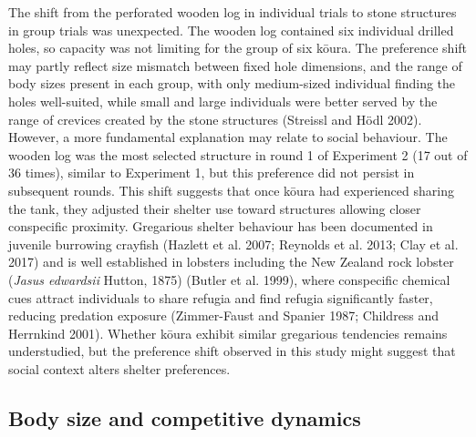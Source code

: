 \documentclass[
  12pt,
  a4paper,
  oneside]{scrbook}
\begin{document}
The shift from the perforated wooden log in individual trials to stone
structures in group trials was unexpected. The wooden log contained six
individual drilled holes, so capacity was not limiting for the group of
six kōura. The preference shift may partly reflect size mismatch between
fixed hole dimensions, and the range of body sizes present in each
group, with only medium-sized individual finding the holes well-suited,
while small and large individuals were better served by the range of
crevices created by the stone structures (Streissl and Hödl 2002).
However, a more fundamental explanation may relate to social behaviour.
The wooden log was the most selected structure in round 1 of Experiment
2 (17 out of 36 times), similar to Experiment 1, but this preference did
not persist in subsequent rounds. This shift suggests that once kōura
had experienced sharing the tank, they adjusted their shelter use toward
structures allowing closer conspecific proximity. Gregarious shelter
behaviour has been documented in juvenile burrowing crayfish (Hazlett et
al. 2007; Reynolds et al. 2013; Clay et al. 2017) and is well
established in lobsters including the New Zealand rock lobster
(\emph{Jasus edwardsii} Hutton, 1875) (Butler et al. 1999), where
conspecific chemical cues attract individuals to share refugia and find
refugia significantly faster, reducing predation exposure (Zimmer-Faust
and Spanier 1987; Childress and Herrnkind 2001). Whether kōura exhibit
similar gregarious tendencies remains understudied, but the preference
shift observed in this study might suggest that social context alters
shelter preferences.

\subsection{Body size and competitive
dynamics}\label{body-size-and-competitive-dynamics}
\end{document}
